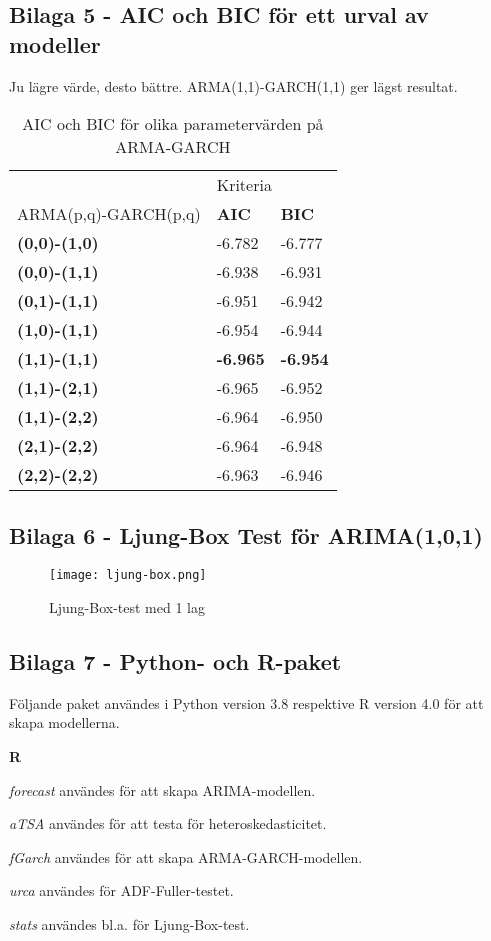 \documentclass[11pt]{article}
\begin{document}
\subsection{Bilaga 5 - AIC och BIC för ett urval av modeller}
Ju lägre värde, desto bättre. ARMA(1,1)-GARCH(1,1) ger lägst resultat.
\begin{table}[H]
\caption{AIC och BIC för olika parametervärden på ARMA-GARCH}
\begin{tabular}{||lll||}
\hline
& \multicolumn{2}{l||}{Kriteria} \\
ARMA(p,q)-GARCH(p,q) & \textbf{AIC} & \textbf{BIC}\\ \hline\hline
{\textbf{(0,0)-(1,0)}} & -6.782  & -6.777 \\ \cline{2-3} 
{\textbf{(0,0)-(1,1)}} & -6.938  & -6.931 \\ \cline{2-3}
{\textbf{(0,1)-(1,1)}} & -6.951  & -6.942 \\ \cline{2-3} 
{\textbf{(1,0)-(1,1)}} & -6.954  & -6.944 \\ \cline{2-3} 
{\textbf{(1,1)-(1,1)}} & \textbf{-6.965}  & \textbf{-6.954} \\ \cline{2-3} 
{\textbf{(1,1)-(2,1)}} & -6.965  & -6.952 \\ \cline{2-3} 
{\textbf{(1,1)-(2,2)}} & -6.964  & -6.950 \\ \cline{2-3}
{\textbf{(2,1)-(2,2)}} & -6.964  & -6.948 \\ \cline{2-3} 
{\textbf{(2,2)-(2,2)}} & -6.963  & -6.946 \\ \hline
\end{tabular}
\end{table}


\subsection{Bilaga 6 - Ljung-Box Test för ARIMA(1,0,1)}
\begin{figure}[H]
\caption{Ljung-Box-test med 1 lag}
\texttt{[image: ljung-box.png]}
\centering
\end{figure}


\subsection{Bilaga 7 - Python- och R-paket}
Följande paket användes i Python version 3.8 respektive R version 4.0 för att skapa modellerna. 

\textbf{R} \par
\textit{forecast} användes för att skapa ARIMA-modellen. \par
\textit{aTSA} användes för att testa för heteroskedasticitet. \par
\textit{fGarch} användes för att skapa ARMA-GARCH-modellen. \par
\textit{urca} användes för ADF-Fuller-testet. \par
\textit{stats} användes bl.a. för Ljung-Box-test. \par
\end{document}
